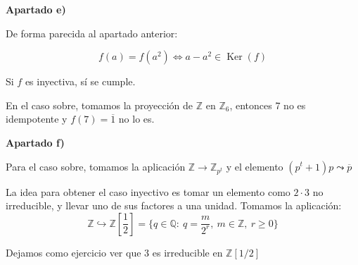 \documentclass[openany]{book}
\begin{document}
\begin{exercise}
\begin{flushright}
    \textbf{Apartado e)}
\end{flushright}

De forma parecida al apartado anterior:

$$ f(a) = f(a^2)\iff a-a^2 \in \operatorname{Ker}(f) $$

Si $ f $ es inyectiva, sí se cumple. 

En el caso sobre, tomamos la proyección de $ \mathbb{Z} $ en $ \mathbb{Z}_{6} $, entonces 7 no es idempotente y $ f(7) = \overline{1} $ no lo es.

\begin{flushright}
    \textbf{Apartado f)}
\end{flushright}





Para el caso sobre, tomamos la aplicación $ \mathbb{Z} \to \mathbb{Z}_{p^{t}} $ y el elemento $ (p^{t}+1)p \leadsto \overline{p} $

La idea para obtener el caso inyectivo es tomar un elemento como $ 2\cdot 3 $ no irreducible, y llevar uno de sus factores a una unidad. Tomamos la aplicación:
$$ \mathbb{Z} \hookrightarrow \mathbb{Z}\left[\dfrac{1}{2}\right] = \{q \in \mathbb{Q}:\ q = \dfrac{m}{2^{r}},\ m \in \mathbb{Z},\ r\geq  0\} $$

Dejamos como ejercicio ver que 3 es irreducible en $ \mathbb{Z}[1/2] $

\end{exercise}

\setcounter{ex}{6}
\end{document}
